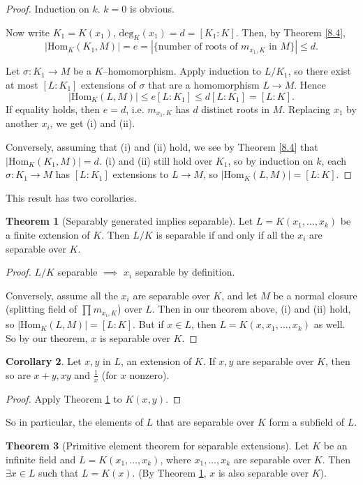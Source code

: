\documentclass{article}
\theoremstyle{definition}
\newtheorem{theorem}{Theorem}[section]
\newtheorem{cor}[theorem]{Corollary}
\begin{document}
\begin{proof}
    Induction on $k$. $k=0$ is obvious.
    
    Now write $K_1=K(x_1)$, $\text{deg}_{K}(x_1) = d = [K_1 : K]$. Then, by Theorem \ref{8.4}, $$|\text{Hom}_K(K_1,M)| = e = |\{\text{number of roots of }m_{x_1,K} \text{ in } M\}| \le d.$$
    
    Let $\sigma : K_1 \to M$ be a $K$--homomorphism. Apply induction to $L/K_1$, so there exist at most $[L : K_1]$ extensions of $\sigma$ that are a homomorphism $L \to M$. Hence
    \[
    |\text{Hom}_K(L,M)| \le e [L:K_1] \le d[L:K_1] = [L:K].
    \]
    If equality holds, then $e=d$, i.e. $m_{x_1,K}$ has $d$ distinct roots in $M$. Replacing $x_1$ by another $x_i$, we get (i) and (ii).
    \vspace{1mm}
    
    Conversely, assuming that (i) and (ii) hold, we see by Theorem \ref{8.4} that $|\text{Hom}_K(K_1,M)|=d$. (i) and (ii) still hold over $K_1$, so by induction on $k$, each $\sigma : K_1 \to M$ has $[L:K_1]$ extensions to $L \to M$, so $|\text{Hom}_K(L,M)|=[L:K]$.
\end{proof}
This result has two corollaries.
\begin{theorem}[Separably generated implies separable]\label{8.6}
    Let $L=K(x_1,\ldots,x_k)$ be a finite extension of $K$. Then $L/K$ is separable if and only if all the $x_i$ are separable over $K$.
\end{theorem}
\begin{proof}
    $L/K$ separable $\implies $ $x_i$ separable by definition.
    \vspace{1mm}
    
    Conversely, assume all the $x_i$ are separable over $K$, and let $M$ be a normal closure (splitting field of $\prod_{}^{} m_{x_i,K}$) over $L$. Then in our theorem above, (i) and (ii) hold, so $|\text{Hom}_K(L,M)|=[L:K]$. But if $x \in L$, then $L = K(x,x_1,\ldots,x_k)$ as well. So by our theorem, $x$ is separable over $K$.
\end{proof}
\begin{cor}
    Let $x,y$ in $L$, an extension of $K$. If $x,y$ are separable over $K$, then so are $x+y,xy$ and $\frac{1}{x}$ (for $x$ nonzero).
\end{cor}
\begin{proof}
    Apply Theorem \ref{8.6} to $K(x,y)$.
\end{proof}
So in particular, the elements of $L$ that are separable over $K$ form a subfield of $L$.
\begin{theorem}[Primitive element theorem for separable extensions]
    Let $K$ be an infinite field and $L=K(x_1,\ldots,x_k)$, where $x_1,\ldots,x_k$ are separable over $K$. Then $\exists x \in L$ such that $L=K(x)$. (By Theorem \ref{8.6}, $x$ is also separable over $K$).
\end{theorem}
\end{document}

